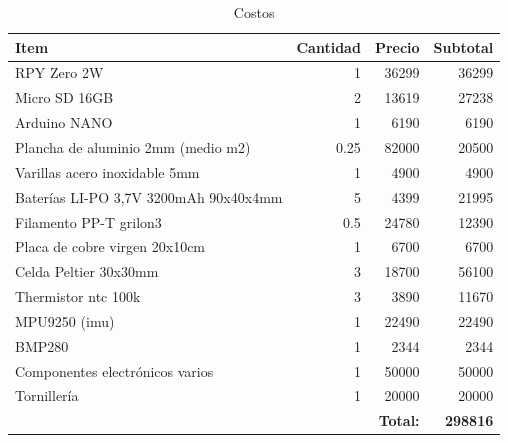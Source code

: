    \begin{table}[H]
     \centering
     \begin{tabular}{|l|r|r|r|}
     \hline
     \textbf{Item} & \textbf{Cantidad} & \textbf{Precio} & \textbf{Subtotal} \\
     \hline
     RPY Zero 2W                            & 1     & 36299  & 36299  \\
     Micro SD 16GB                          & 2     & 13619  & 27238  \\
     Arduino NANO                           & 1     & 6190   & 6190   \\
     Plancha de aluminio 2mm (medio m2)     & 0.25  & 82000  & 20500  \\
     Varillas acero inoxidable 5mm          & 1     & 4900   & 4900   \\
     Baterías LI-PO 3,7V 3200mAh 90x40x4mm   & 5     & 4399   & 21995  \\
     Filamento PP-T grilon3                 & 0.5   & 24780  & 12390  \\
     Placa de cobre virgen 20x10cm          & 1     & 6700   & 6700   \\
     Celda Peltier 30x30mm                  & 3     & 18700  & 56100  \\
     Thermistor ntc 100k                    & 3     & 3890   & 11670  \\
     MPU9250 (\acrshort{imu})               & 1     & 22490  & 22490  \\
     BMP280                                 & 1     & 2344   & 2344   \\
     Componentes electrónicos varios        & 1     & 50000  & 50000  \\
     Tornillería                            & 1     & 20000  & 20000  \\
     \hline
     \multicolumn{3}{|r|}{\textbf{Total:}} & \textbf{298816} \\
     \hline
     \end{tabular}
     \caption{Costos}
     \label{tab:costos}
   \end{table}
